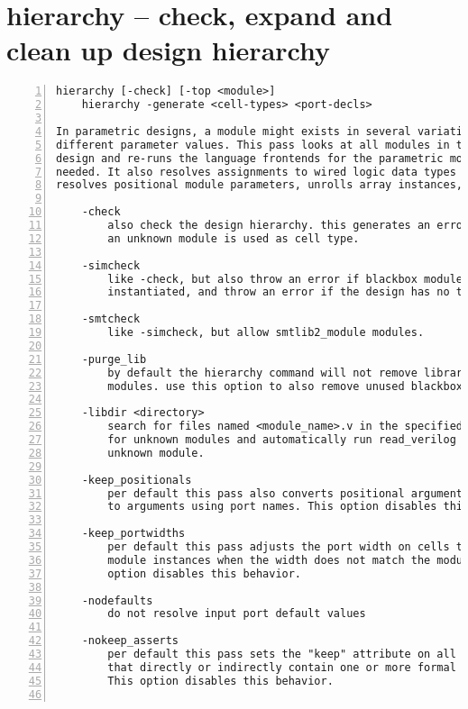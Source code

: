 \section{hierarchy -- check, expand and clean up design hierarchy}
\label{cmd:hierarchy}
\begin{lstlisting}[numbers=left,frame=single]
    hierarchy [-check] [-top <module>]
    hierarchy -generate <cell-types> <port-decls>

In parametric designs, a module might exists in several variations with
different parameter values. This pass looks at all modules in the current
design and re-runs the language frontends for the parametric modules as
needed. It also resolves assignments to wired logic data types (wand/wor),
resolves positional module parameters, unrolls array instances, and more.

    -check
        also check the design hierarchy. this generates an error when
        an unknown module is used as cell type.

    -simcheck
        like -check, but also throw an error if blackbox modules are
        instantiated, and throw an error if the design has no top module.

    -smtcheck
        like -simcheck, but allow smtlib2_module modules.

    -purge_lib
        by default the hierarchy command will not remove library (blackbox)
        modules. use this option to also remove unused blackbox modules.

    -libdir <directory>
        search for files named <module_name>.v in the specified directory
        for unknown modules and automatically run read_verilog for each
        unknown module.

    -keep_positionals
        per default this pass also converts positional arguments in cells
        to arguments using port names. This option disables this behavior.

    -keep_portwidths
        per default this pass adjusts the port width on cells that are
        module instances when the width does not match the module port. This
        option disables this behavior.

    -nodefaults
        do not resolve input port default values

    -nokeep_asserts
        per default this pass sets the "keep" attribute on all modules
        that directly or indirectly contain one or more formal properties.
        This option disables this behavior.


\end{lstlisting}
